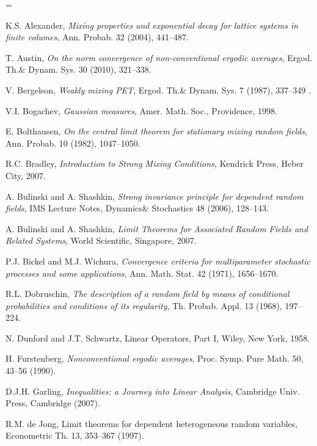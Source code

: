  
 
  
  \begin{thebibliography}{Bow75}

\itemsep=\smallskipamount


K.S. Alexander, {\em Mixing properties and exponential decay for
 lattice systems in finite volumes}, Ann. Probab. 32 (2004), 441--487.

T. Austin, {\em On the norm convergence of non-conventional ergodic
averages}, Ergod. Th.\& Dynam. Sys. 30 (2010), 321--338.

V. Bergelson, {\em Weakly mixing PET}, 
Ergod. Th.\& Dynam. Sys. 7
 (1987), 337--349 .
 
V.I. Bogachev, {\em Gaussian measures}, Amer. Math. Soc., Providence,
1998. 

E. Bolthausen, {\em On the central limit theorem for stationary mixing
random fields}, Ann. Probab. 10 (1982), 1047--1050.

 R.C. Bradley, {\em Introduction to Strong Mixing Conditions,}
 Kendrick Press, Heber City, 2007.

A. Bulinski and A. Shashkin, {\em Strong invariance principle for dependent
random fields}, IMS Lecture Notes, Dynamics\& Stochastics 48 (2006), 128--143.

A. Bulinski and A. Shashkin, {\em Limit Theorems for Associated Random 
Fields and Related Systems}, World Scientific, Singapore, 2007.

P.J. Bickel and M.J. Wichura, {\em Convergence criteria for multiparameter
stochastic processes and some applications}, Ann. Math. Stat. 42 (1971),
1656--1670.

R.L. Dobruschin, {\em The description of a random field by means of conditional
probabilities and conditions of its regularity}, Th. Probab. Appl. 13 (1968), 
197--224.

N. Dunford and J.T. Schwartz, Linear Operators, Part I, Wiley, New York, 1958.

H. Furstenberg, {\em Nonconventional ergodic averages}, Proc.
Symp. Pure Math. 50, 43--56 (1990).

D.J.H. Garling, {\em Inequalities: a Journey into Linear Analysis}, Cambridge 
Univ. Press, Cambridge (2007).

R.M. de Jong, {Limit theorems for dependent heterogeneous random variables},
Econometric Th. 13, 353--367 (1997).


\end{thebibliography}
